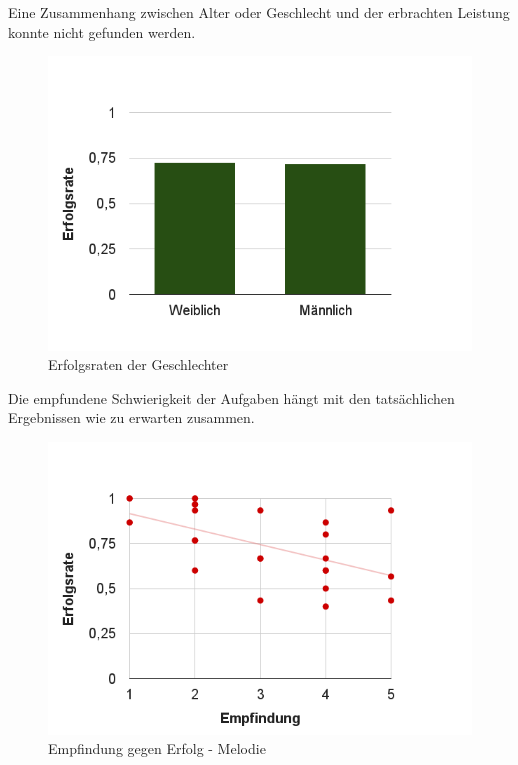 \documentclass{acm_proc_article-sp}
\begin{document}
Eine Zusammenhang zwischen Alter oder Geschlecht und der erbrachten Leistung konnte nicht gefunden werden.\\
\begin{figure}[H]
\includegraphics[width=1.0\linewidth]{Abbildungen/Geschlecht-Erfolg.png}
\caption{Erfolgsraten der Geschlechter}
\label{Geschlechter}
\end{figure}
Die empfundene Schwierigkeit der Aufgaben hängt mit den tatsächlichen Ergebnissen wie zu erwarten zusammen.
\begin{figure}[H]
\includegraphics[width=1.0\linewidth]{Abbildungen/Empfindung-Erfolg_Melodie.png}
\caption{Empfindung gegen Erfolg - Melodie}
\label{Geschlechter}
\end{figure}
\end{document}
